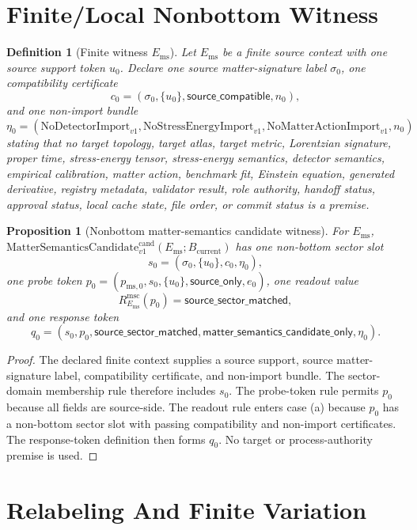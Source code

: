 \documentclass[11pt]{article}
\newcommand{\Bcur}{B_{\mathrm{current}}}
\newcommand{\NoSE}{\mathrm{NoStressEnergyImport}_{v1}}
\newcommand{\NoAction}{\mathrm{NoMatterActionImport}_{v1}}
\newcommand{\NoDetector}{\mathrm{NoDetectorImport}_{v1}}
\newcommand{\MSCand}{\mathrm{MatterSemanticsCandidate}^{\mathrm{cand}}_{v1}}
\newtheorem{definition}{Definition}
\newtheorem{proposition}{Proposition}
\begin{document}
\section{Finite/Local Nonbottom Witness}

\begin{definition}[Finite witness \(E_{\mathrm{ms}}\)]
Let \(E_{\mathrm{ms}}\) be a finite source context with one source support
token \(u_0\). Declare one source matter-signature label \(\sigma_0\), one
compatibility certificate
\[
  c_0=(\sigma_0,\{u_0\},\mathsf{source\_compatible},n_0),
\]
and one non-import bundle
\[
  \eta_0=(\NoDetector,\NoSE,\NoAction,n_0)
\]
stating that no target topology, target atlas, target metric, Lorentzian
signature, proper time, stress-energy tensor, stress-energy semantics,
detector semantics, empirical calibration, matter action, benchmark fit,
Einstein equation, generated derivative, registry metadata, validator result,
role authority, handoff status, approval status, local cache state, file
order, or commit status is a premise.
\end{definition}

\begin{proposition}[Nonbottom matter-semantics candidate witness]
For \(E_{\mathrm{ms}}\), \(\MSCand(E_{\mathrm{ms}};\Bcur)\) has one non-bottom
sector slot
\[
  s_0=(\sigma_0,\{u_0\},c_0,\eta_0),
\]
one probe token \(p_0=(p_{\mathrm{ms},0},s_0,\{u_0\},
\mathsf{source\_only},e_0)\), one readout value
\[
  R_{E_{\mathrm{ms}}}^{\mathrm{msc}}(p_0)
  =
  \mathsf{source\_sector\_matched},
\]
and one response token
\[
  q_0=(s_0,p_0,\mathsf{source\_sector\_matched},
  \mathsf{matter\_semantics\_candidate\_only},\eta_0).
\]
\end{proposition}

\begin{proof}
The declared finite context supplies a source support, source matter-signature
label, compatibility certificate, and non-import bundle. The sector-domain
membership rule therefore includes \(s_0\). The probe-token rule permits
\(p_0\) because all fields are source-side. The readout rule enters case (a)
because \(p_0\) has a non-bottom sector slot with passing compatibility and
non-import certificates. The response-token definition then forms \(q_0\).
No target or process-authority premise is used.
\end{proof}

\section{Relabeling And Finite Variation}
\end{document}
